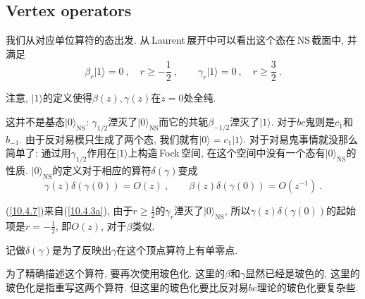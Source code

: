 \subsection*{Vertex operators}
我们从对应单位算符的态出发. 从\,Laurent\,展开中可以看出这个态在\,NS\,截面中, 并满足
\begin{equation}
    \beta_{r}\lvert 1\rangle =0\:, \quad r\geq -\frac{1}{2} \:, \qquad
    \gamma_{r}\lvert1\rangle=0 \:, \quad r\geq \frac{3}{2}\:. \label{10.4.6}
\end{equation}
\begin{tcolorbox}
注意, $\lvert 1\rangle$的定义使得$ \beta(z),\gamma(z) $在$ z=0 $处全纯.
\end{tcolorbox}
\noindent 这并不是基态$ \lvert 0\rangle_{\mathrm{NS}}$: $\gamma_{1/2}$湮灭了$ \lvert 0\rangle_{\mathrm{NS}} $而它的共轭$ \beta_{-1/2} $湮灭了$ \lvert1\rangle$. 对于$ bc $鬼则是$ c_{1} $和$ b_{-1}$. 由于反对易模只生成了两个态, 我们就有$ \lvert0\rangle =c_{1}\lvert1\rangle$. 对于对易鬼事情就没那么简单了: 通过用$ \gamma_{1/2} $作用在$ \lvert1\rangle $上构造\,Fock\,空间, 在这个空间中没有一个态有$ \lvert 0\rangle_{\mathrm{NS}} $的性质. $\lvert 0\rangle_{\mathrm{NS}} $的定义对于相应的算符$ \delta(\gamma) $变成
\begin{equation}
    \gamma(z)\delta(\gamma(0)) = O(z) \:, \qquad
    \beta(z) \delta(\gamma(0)) = O(z^{-1})\:. \label{10.4.7}
\end{equation}
\begin{tcolorbox}
    (\ref{10.4.7})来自(\ref{10.4.3a}), 由于$ r\geq \frac{1}{2} $的$ \gamma_{r} $湮灭了$ \lvert 0\rangle_{\mathrm{NS}}$, 所以$ \gamma(z)\delta(\gamma(0)) $的起始项是$ r=-\frac{1}{2}$, 即$ O(z)$, 对于$ \beta $类似.
\end{tcolorbox}
\noindent 记做$ \delta(\gamma) $是为了反映出$ \gamma $在这个顶点算符上有单零点. 

为了精确描述这个算符, 要再次使用玻色化. 这里的$ \beta $和$ \gamma $显然已经是玻色的, 这里的玻色化是指重写这两个算符. 但这里的玻色化要比反对易$ bc $理论的玻色化要复杂些.

